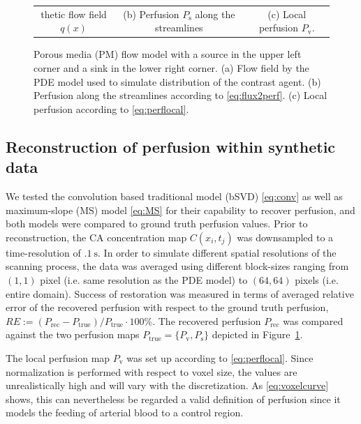 \documentclass[journal,twocolumn]{IEEEtran}
\newcommand{\Perf}{P}
\newcommand{\Perfv}{P_{\mathrm{v}}}
\newcommand{\Perfs}{P_{\mathrm{s}}}
\begin{document}
\begin{figure}[h!tb]
\begin{tabular}{c c c}
thetic flow field $q(x)$ & (b) Perfusion $\Perfs$ along the streamlines  & (c) Local perfusion $\Perfv$.
	\end{tabular}
	\caption{Porous media (PM) flow model with a source in the upper left corner and a sink in the lower right corner. (a) Flow field by the PDE model used to simulate distribution of the contrast agent. (b) Perfusion along the streamlines according to \eqref{eq:flux2perf}. (c) Local perfusion according to \eqref{eq:perflocal}.}
        \label{fig:flowpressureperfusion}
\end{figure}


	\subsection{Reconstruction of perfusion within synthetic data}\label{sec:RecPhantom}


	We tested the convolution based traditional model (bSVD) \eqref{eq:conv} as well as maximum-slope (MS) model \eqref{eq:MS} for their capability to recover perfusion, and both models were compared to ground truth perfusion values.
	Prior to reconstruction, the CA concentration map $C(x_i,t_j)$ was downsampled to a time-resolution of $\SI{.1}{\second}$.
	In order to simulate different spatial resolutions of the scanning process, the data was averaged using different block-sizes ranging from $(1,1)$ pixel (i.e. same resolution as the PDE model) to $(64,64)$ pixels (i.e. entire domain).		
	Success of restoration was measured in terms of averaged relative error of the recovered perfusion with respect to the ground truth perfusion, $RE :=  (\Perf_{\mathrm{rec}} - \Perf_{\mathrm{true}})/\Perf_{\mathrm{true}}\cdot 100\%$.
	The recovered perfusion $\Perf_{\mathrm{rec}}$ was compared against the two perfusion maps $\Perf_{\mathrm{true}}=\{\Perfv,\Perfs\}$ depicted in Figure~\ref{fig:flowpressureperfusion}.
	
	The local perfusion map $\Perfv$ was set up according to \eqref{eq:perflocal}. 
	Since normalization is performed with respect to voxel size, the values are unrealistically high and will vary with the discretization.
	As \eqref{eq:voxelcurve} shows, this can nevertheless be regarded a valid definition of perfusion since it models the feeding of arterial blood to a control region.
	
\end{document}
